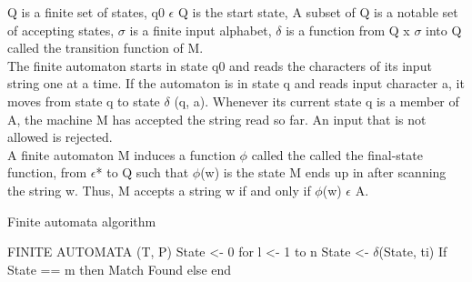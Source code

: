 \documentclass[11pt,a4paper]{article}
\begin{document}
Q is a finite set of states,
q0 \begin{math}\epsilon\end{math} Q is the start state,
A subset of Q is a notable set of accepting states,
\begin{math}\sigma\end{math} is a finite input alphabet,
\begin{math}\delta\end{math} is a function from Q x \begin{math}\sigma\end{math} into Q called the transition function of M.
\\
The finite automaton starts in state q0 and reads the characters of its input string one at a time. If the automaton is in state q and reads input character a, it moves from state q to state \begin{math}\delta\end{math} (q, a). Whenever its current state q is a member of A, the machine M has accepted the string read so far. An input that is not allowed is rejected.
\\
A finite automaton M induces a function \begin{math}\phi\end{math} called the called the final-state function, from \begin{math}\epsilon\end{math}* to Q such that \begin{math}\phi\end{math}(w) is the state M ends up in after scanning the string w. Thus, M accepts a string w if and only if \begin{math}\phi\end{math}(w) \begin{math}\epsilon\end{math} A.

\begin{algorithm}[H]
\caption*{Finite automata algorithm}
\label{psuedocode}
\begin{algorithmic}
\STATE FINITE AUTOMATA (T, P)
\STATE State <- 0
\STATE for l <- 1 to n
\STATE State <- \begin{math}\delta\end{math}(State, ti)
\STATE If State == m then
\STATE Match Found
\STATE else
\STATE end
\end{algorithmic}
\end{algorithm}
\end{document}
